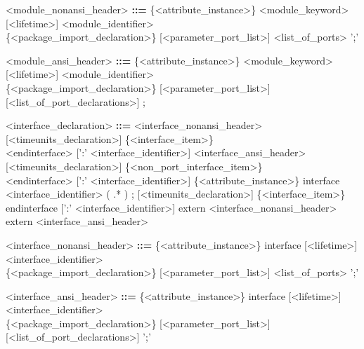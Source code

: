 \documentclass{article}
\begin{document}
\begin{grammar}
    <module_nonansi_header> \textbf{::=} \{<attribute_instance>\} <module_keyword> [<lifetime>] <module_identifier> \\
                                         \{<package_import_declaration>\} [<parameter_port_list>] <list_of_ports> ';'
\end{grammar}

\begin{grammar}
    <module_ansi_header> \textbf{::=} \{<attribute_instance>\} <module_keyword> [<lifetime>] <module_identifier> \\
                                      \{<package_import_declaration>\} [<parameter_port_list>] [<list_of_port_declarations>] ;
\end{grammar}

\begin{grammar}
    <interface_declaration> \textbf{::=} <interface_nonansi_header> [<timeunits_declaration>] \{<interface_item>\} \\
                                         <endinterface> [':' <interface_identifier>]
                                         \alt <interface_ansi_header> [<timeunits_declaration>] \{<non_port_interface_item>\} \\
                                         <endinterface> [':' <interface_identifier>]
                                         \alt \{<attribute_instance>\} interface <interface_identifier> ( .* ) ;
                                         [<timeunits_declaration>] \{<interface_item>\} endinterface [':' <interface_identifier>]
                                         \alt extern <interface_nonansi_header>
                                         \alt extern <interface_ansi_header>
\end{grammar}

\begin{grammar}
<interface_nonansi_header> \textbf{::=} \{<attribute_instance>\} interface [<lifetime>] <interface_identifier> \\
                                        \{<package_import_declaration>\} [<parameter_port_list>] <list_of_ports> ';'
\end{grammar}
\begin{grammar}
<interface_ansi_header> \textbf{::=} \{<attribute_instance>\} interface [<lifetime>] <interface_identifier> \\
                                     \{<package_import_declaration>\} [<parameter_port_list>] [<list_of_port_declarations>] ';'
\end{grammar}
\end{document}
